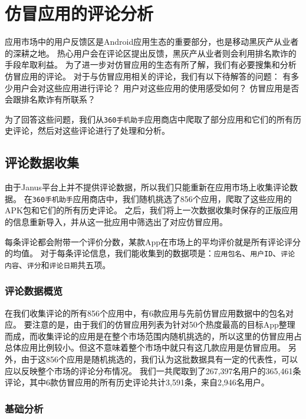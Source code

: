 \chapter{仿冒应用的评论分析}
\label{chp:feedback}

应用市场中的用户反馈区是Android应用生态的重要部分，也是移动黑灰产从业者的深耕之地。
热心用户会在评论区提出反馈，黑灰产从业者则会利用排名欺诈的手段牟取利益。
为了进一步对仿冒应用的生态有所了解，我们有必要搜集和分析仿冒应用的评论。
对于与仿冒应用相关的评论，我们有以下待解答的问题：
有多少用户会对这些应用进行评论？
用户对这些应用的使用感受如何？
仿冒应用是否会跟排名欺诈有所联系？

为了回答这些问题，我们从\texttt{360手机助手}应用商店中爬取了部分应用和它们的所有历史评论，然后对这些评论进行了处理和分析。

\section{评论数据收集}
由于Janus平台上并不提供评论数据，所以我们只能重新在应用市场上收集评论数据。
在\texttt{360手机助手}应用商店中，我们随机挑选了856个应用，爬取了这些应用的APK包和它们的所有历史评论。
之后，我们将上一次数据收集时保存的正版应用的信息重新导入\mytool，并从这一批应用中筛选出了对应仿冒应用。

每条评论都会附带一个评价分数，某款App在市场上的平均评价就是所有评论评分的均值。
对于每条评论信息，我们能收集到的数据项是：\texttt{应用包名}、\texttt{用户ID}、\texttt{评论内容}、\texttt{评分}和\texttt{评论日期}共五项。

\subsection{评论数据概览}
在我们收集评论的所有856个应用中，有6款应用与先前仿冒应用数据中的包名对应。
要注意的是，由于我们的仿冒应用列表为针对50个热度最高的目标App整理而成，而收集评论的应用是在整个市场范围内随机挑选的，所以这里的仿冒应用占总体应用比例较小。但这不意味着整个市场中就只有这几款应用是仿冒应用。
另外，由于这856个应用是随机挑选的，我们认为这批数据具有一定的代表性，可以应以反映整个市场的评论分布情况。
我们一共爬取到了267,397名用户的365,461条评论，其中6款仿冒应用的所有历史评论共计3,591条，来自2,946名用户。

\subsection{基础分析}

